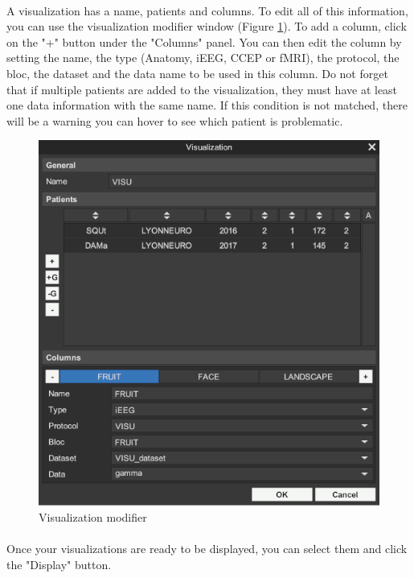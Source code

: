 \documentclass[a4paper]{article}
\begin{document}
\paragraph{} A visualization has a name, patients and columns. To edit all of this information, you can use the visualization modifier window (Figure \ref{visuModifierUI}). To add a column, click on the "+" button under the "Columns" panel. You can then edit the column by setting the name, the type (Anatomy, iEEG, CCEP or fMRI), the protocol, the bloc, the dataset and the data name to be used in this column. Do not forget that if multiple patients are added to the visualization, they must have at least one data information with the same name. If this condition is not matched, there will be a warning you can hover to see which patient is problematic.
\begin{figure}[H]
\begin{center}
\includegraphics[scale=0.4]{VisualizationModifier.png}
\end{center}
\caption{\label{visuModifierUI}Visualization modifier}
\end{figure}
\paragraph{} Once your visualizations are ready to be displayed, you can select them and click the "Display" button.
\end{document}
